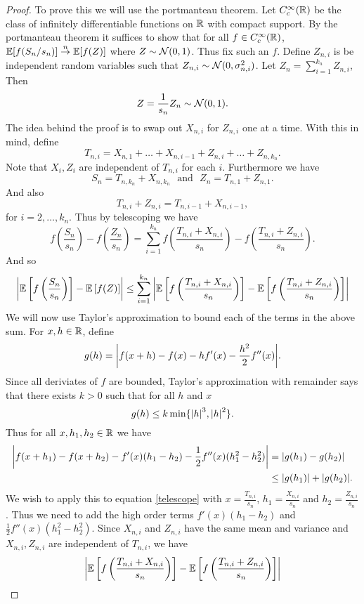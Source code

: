 \begin{proof}
To prove this we will use the portmanteau theorem. Let $C^\infty_c({\mathbb R})$ be the class of infinitely differentiable functions on ${\mathbb R}$ with compact support. By the portmanteau theorem it suffices to show that for all $f \in C^\infty_c({\mathbb R})$, ${\mathbb{E}}[f(S_n/s_n)] \stackrel{n}{\to} {\mathbb{E}}[f(Z)]$ where $Z \sim {{\mathcal{N}}}(0,1)$. Thus fix such an $f$. Define $Z_{n,i}$ is be independent random variables such that $Z_{n,i} \sim {{\mathcal{N}}}(0,\sigma_{n,i}^2)$. Let $Z_n = \sum_{i=1}^{k_n}Z_{n,i}$, Then
\[Z=\frac{1}{s_n}Z_n \sim {{\mathcal{N}}}(0,1). \]
The idea behind the proof is to swap out $X_{n,i}$ for $Z_{n,i}$ one at a time. With this in mind, define
\[T_{n,i}= X_{n,1}+\ldots+X_{n,i-1}+Z_{n,i}+\ldots+Z_{n,k_n}. \]
Note that $X_i,Z_i$ are independent of $T_{n,i}$ for each $i$. Furthermore we have
\[S_n = T_{n,k_n}+X_{n,k_n}~~~\text{and}~~~Z_n = T_{n,1}+Z_{n,1}. \]
And also
\[T_{n,i}+Z_{n,i} = T_{n,i-1}+X_{n,i-1}, \]
for $i=2,\ldots, k_n$. Thus by telescoping we have
\[f\left(\frac{S_n}{s_n}\right)-f\left(\frac{Z_n}{s_n}\right)=\sum_{i=1}^{k_n} f\left(\frac{T_{n,i}+X_{n,i}}{s_n}\right)-f\left(\frac{T_{n,i}+Z_{n,i}}{s_n}\right). \]
And so 
\begin{equation}\label{telescope}
    {\left\lvert{\mathbb{E}}\left[f\left(\frac{S_n}{s_n}\right)\right]-{\mathbb{E}}\left[f(Z)\right]\right\rvert}\le \sum_{i=1}^{k_n}{\left\lvert{\mathbb{E}}\left[f\left(\frac{T_{n,i}+X_{n,i}}{s_n}\right)\right]-{\mathbb{E}}\left[f\left(\frac{T_{n,i}+Z_{n,i}}{s_n}\right)\right]\right\rvert}
\end{equation}
We will now use Taylor's approximation to bound each of the terms in the above sum. For $x,h \in {\mathbb R}$, define
\[g(h) = {\left\lvert f(x+h)-f(x)-hf'(x)-\frac{h^2}{2}f''(x)\right\rvert}.\]
Since all deriviates of $f$ are bounded, Taylor's approximation with remainder says that there exists $k > 0$ such that for all $h$ and $x$
\[g(h) \le k \min\{{\left\lvert h\right\rvert}^3,{\left\lvert h\right\rvert}^2\}. \]
Thus for all $x,h_1,h_2\in {\mathbb R}$ we have
\begin{align*}
    {\left\lvert f(x+h_1)-f(x+h_2)-f'(x)(h_1-h_2)-\frac{1}{2}f''(x)(h_1^2-h_2^2)\right\rvert}&={\left\lvert g(h_1)-g(h_2)\right\rvert} \\
    &\le {\left\lvert g(h_1)\right\rvert}+{\left\lvert g(h_2)\right\rvert}.
\end{align*}
We wish to apply this to equation \eqref{telescope} with $x=\frac{T_{n,i}}{s_n}$, $h_1=\frac{X_{n,i}}{s_n}$ and $h_2 = \frac{Z_{n,i}}{s_n}$. Thus we need to add the high order terms $f'(x)(h_1-h_2)$ and $\frac{1}{2}f''(x)(h_1^2-h_2^2)$. Since $X_{n,i}$ and  $Z_{n,i}$ have the same mean and variance and $X_{n,i},Z_{n,i}$ are independent of $T_{n,i}$, we have
\begin{align*}
    &\abs{\E\left[f\left(\frac{T_{n,i}+X_{n,i}}{s_n}\right)\right]-\E\left[f\left(\frac{T_{n,i}+Z_{n,i}}{s_n}\right)\right]}\\

\end{align*}
\end{proof}
